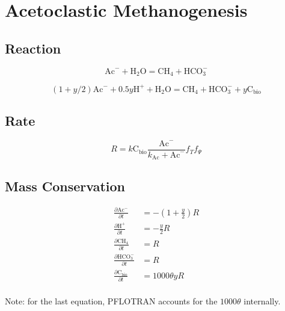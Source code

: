 \documentclass[12pt, a4paper]{article}
\begin{document}
\clearpage
\section{Acetoclastic Methanogenesis}
\subsection{Reaction}
\begin{equation}
\label{rxnam}
\text{Ac}^- +  \text{H}_2\text{O} =  \text{CH}_4 + \text{HCO}_3^-
\end{equation}

\begin{equation}
\label{rxnam}
(1 + y/2)\text{Ac}^- +  0.5y \text{H}^+ + \text{H}_2\text{O} =  \text{CH}_4 + \text{HCO}_3^- + y \text{C}_\text{bio}
\end{equation}

\subsection{Rate}
\begin{equation}
\label{amrate}
R =  k \text{C}_\text{bio} \frac{\text{Ac}^-}{k_\text{Ac} + \text{Ac}^-}  f_T f_\Psi
\end{equation}

\subsection{Mass Conservation}
\begin{align*}
\frac{\partial \text{Ac}^-}{\partial t} & = -(1 + \frac{y}{2})R \\
\frac{\partial \text{H}^+}{\partial t} & = -\frac{y}{2}R \\
\frac{\partial \text{CH}_4}{\partial t} & = R \\
\frac{\partial \text{HCO}_3^-}{\partial t} & = R \\
\frac{\partial \text{C}_\text{bio}}{\partial t} & = 1000\theta y R \\
\end{align*}

Note: for the last equation, PFLOTRAN accounts for the $1000\theta$ internally.
\end{document}
